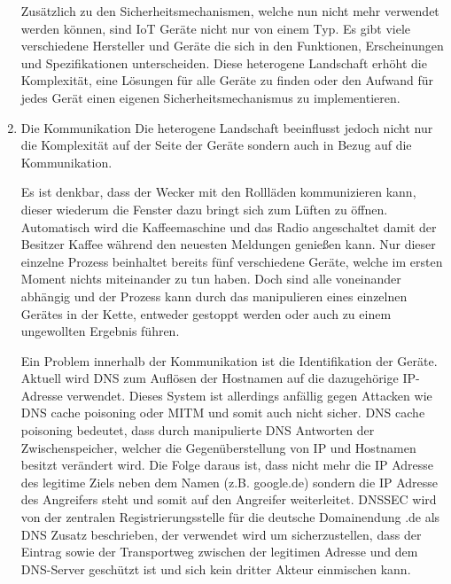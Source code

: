 \begin{enumerate}
        Zusätzlich zu den Sicherheitsmechanismen, welche nun nicht mehr verwendet werden können, sind \ac{IoT} Geräte nicht nur von einem Typ. Es gibt viele verschiedene Hersteller und Geräte die sich in den Funktionen, Erscheinungen und Spezifikationen unterscheiden. Diese heterogene Landschaft erhöht die Komplexität, eine Lösungen für alle Geräte zu finden oder den Aufwand für jedes Gerät einen eigenen Sicherheitsmechanismus zu implementieren.
        
        \item Die Kommunikation
        Die heterogene Landschaft beeinflusst jedoch nicht nur die Komplexität auf der Seite der Geräte sondern auch in Bezug auf die Kommunikation.
    
        Es ist denkbar, dass der Wecker mit den Rollläden kommunizieren kann, dieser wiederum die Fenster dazu bringt sich zum Lüften zu öffnen. Automatisch wird die Kaffeemaschine und das Radio angeschaltet damit der Besitzer Kaffee während den neuesten Meldungen genießen kann.
        Nur dieser einzelne Prozess beinhaltet bereits fünf verschiedene Geräte, welche im ersten Moment nichts miteinander zu tun haben. Doch sind alle voneinander abhängig und der Prozess kann durch das manipulieren eines einzelnen Gerätes in der Kette, entweder gestoppt werden oder auch zu einem ungewollten Ergebnis führen.
        
        Ein Problem innerhalb der Kommunikation ist die Identifikation der Geräte. Aktuell wird \ac{DNS} zum Auflösen der Hostnamen auf die dazugehörige IP-Adresse verwendet. Dieses System ist allerdings anfällig gegen Attacken wie DNS cache poisoning oder \ac{MITM} und somit auch nicht sicher.
        DNS cache poisoning bedeutet, dass durch manipulierte DNS Antworten der Zwischenspeicher, welcher die Gegenüberstellung von IP und Hostnamen besitzt verändert wird. Die Folge daraus ist, dass nicht mehr die IP Adresse des legitime Ziels neben dem Namen (z.B. google.de) sondern die IP Adresse des Angreifers steht und somit auf den Angreifer weiterleitet.
        \ac{DNSSEC} wird von der zentralen Registrierungsstelle für die deutsche Domainendung \glqq .de\grqq{} \cite{denic_eg}
        als \ac{DNS} Zusatz beschrieben, der verwendet wird um sicherzustellen, dass der Eintrag sowie der Transportweg zwischen der legitimen Adresse und dem DNS-Server geschützt ist und sich kein dritter Akteur einmischen kann.
        
    \end{enumerate}
